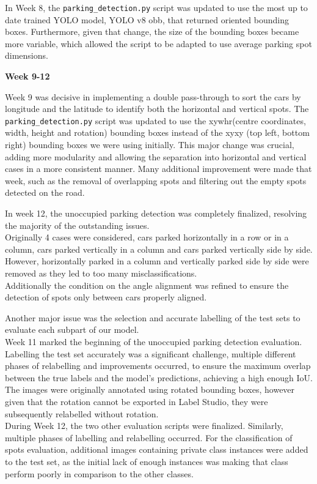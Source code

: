In Week 8, the \texttt{parking\_detection.py} script was updated to use the most
up to date trained YOLO model, YOLO v8 obb, that returned oriented bounding
boxes. Furthermore, given that change, the size of
the bounding boxes became more variable, which allowed the script to be adapted
to use average parking spot dimensions.

\textbf{Week 9-12}

Week 9 was decisive in implementing a double pass-through to sort the cars by
longitude and the latitude to identify both the horizontal and vertical spots.
The \texttt{parking\_detection.py} script was updated to use the
xywhr(centre coordinates, width, height and rotation) bounding boxes instead of
the xyxy (top left, bottom right)  bounding boxes we were using initially. This
major change was crucial, adding more modularity and allowing the
separation into horizontal and vertical cases in a more consistent manner.
Many additional improvement were made that week, such as the removal of
overlapping spots and filtering out the empty spots detected on the road.

In week 12, the unoccupied parking detection was completely finalized, resolving the
majority of the outstanding issues.\\
Originally 4 cases were considered, cars parked horizontally in a row or in a
column, cars parked vertically in a column and cars parked vertically side by
side. However, horizontally parked in a column and vertically parked side by side
were removed as they led to too many misclassifications.\\
Additionally the condition on the angle alignment was refined to ensure
the detection of spots only between cars properly aligned.

Another major issue was the selection and accurate labelling of the test sets to
evaluate each subpart of our model.\\
Week 11 marked the beginning of the unoccupied parking detection evaluation. 
Labelling the test set accurately was a significant challenge, multiple different 
phases of relabelling and improvements occurred, to ensure the maximum overlap 
between the true labels and the model's predictions, achieving a high enough IoU.
The images were originally annotated using rotated bounding boxes, however given that
the rotation cannot be exported in Label Studio, they were subsequently relabelled without rotation.\\ 
During Week 12, the two other evaluation scripts were finalized. 
Similarly, multiple phases of labelling and relabelling occurred. For
the classification of spots evaluation, additional images containing private class instances
were added to the test set, as the initial lack of enough instances was making
that class perform poorly in comparison to the other classes.

\newpage{}